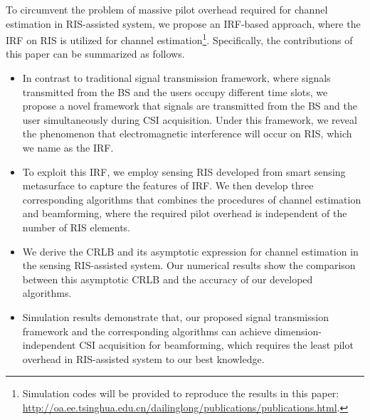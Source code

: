 \documentclass[12pt,draftclsnofoot,journal,onecolumn]{IEEEtran}
\theoremstyle{nonumberplain}
\begin{document}
To circumvent the problem of massive pilot overhead required for channel estimation in RIS-assisted system, we propose an \ac{IRF}-based approach, where the \ac{IRF} on RIS is utilized for channel estimation\footnote{Simulation codes will be provided to reproduce the results in this paper: \url{http://oa.ee.tsinghua.edu.cn/dailinglong/publications/publications.html}.}.
Specifically, the contributions of this paper can be summarized as follows.
    \begin{itemize}
        \item %
        In contrast to traditional signal transmission framework, where signals transmitted from the \ac{BS} and the users occupy different time slots, we propose a novel framework that signals are transmitted from the \ac{BS} and the user simultaneously during CSI acquisition.
        Under this framework, we reveal the phenomenon that electromagnetic interference will occur on RIS, which we name as the \ac{IRF}.
        \item
        To exploit this \ac{IRF}, we employ sensing RIS developed from smart sensing metasurface to capture the features of \ac{IRF}.
        We then develop three corresponding algorithms that combines the procedures of channel estimation and beamforming, where the required pilot overhead is independent of the number of RIS elements.
        \item
        We derive the \ac{CRLB} and its asymptotic expression for channel estimation in the sensing RIS-assisted system.
        Our numerical results show the comparison between this asymptotic \ac{CRLB} and the accuracy of our developed algorithms.
        \item
        Simulation results demonstrate that, our proposed signal transmission framework and the corresponding algorithms can achieve dimension-independent CSI acquisition for beamforming, which requires the least pilot overhead in RIS-assisted system to our best knowledge.

\end{itemize}
\end{document}
